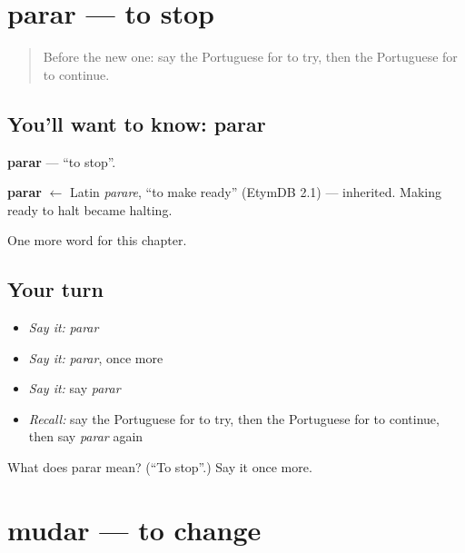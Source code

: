\section[parar]{parar — to stop}

\label{lesson:PT-C139-parar}



\begin{quote}
Before the new one: say the Portuguese for to try, then the Portuguese for to continue.
\end{quote}

\subsection*{You'll want to know: parar}
\textbf{parar} — \textquotedblleft{}to stop\textquotedblright{}.

\begin{cousinweb}
\textbf{parar} $\leftarrow$ Latin \emph{parare}, \textquotedblleft{}to make ready\textquotedblright{} (EtymDB 2.1) — inherited. Making ready to halt became halting.
\end{cousinweb}

\begin{grammarlens}[title={What you've built}]
One more word for this chapter.
\end{grammarlens}

\subsection*{Your turn}
\begin{itemize}
\raggedright
  \item \emph{Say it:} \emph{parar}
  \item \emph{Say it:} \emph{parar}, once more
  \item \emph{Say it:} say \emph{parar}
  \item \emph{Recall:} say the Portuguese for to try, then the Portuguese for to continue, then say \emph{parar} again
\end{itemize}

\begin{tcolorbox}[breakable,colback=teal!4,colframe=teal!35!black,title={Before you move on}]
What does parar mean? (\textquotedblleft{}To stop\textquotedblright{}.) Say it once more.
\end{tcolorbox}
\section[mudar]{mudar — to change}

